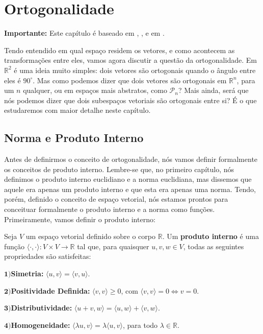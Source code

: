 \chapter{Ortogonalidade}
\label{cap:ortogonalidade}

\textbf{Importante:} Este capítulo é baseado em \cite{axler2026}, \cite{slide5doyuri}, \cite{ruggiero2021algebra} e em \cite{trefethen1997numerical}.

Tendo entendido em qual espaço residem os vetores, e como acontecem as transformações entre eles, vamos agora discutir a questão da ortogonalidade. Em $\mathbb{R}^2$ é uma ideia muito simples: dois vetores são ortogonais quando o ângulo entre eles é $90^\circ$. Mas como podemos dizer que dois vetores são ortogonais em $\mathbb{R}^n$, para um $n$ qualquer, ou em espaços mais abstratos, como $\mathcal{P}_n$? Mais ainda, será que nós podemos dizer que dois subespaços vetoriais são ortogonais entre si? É o que estudaremos com maior detalhe neste capítulo.

\section{Norma e Produto Interno}

Antes de definirmos o conceito de ortogonalidade, nós vamos definir formalmente os conceitos de produto interno. Lembre-se que, no primeiro capítulo, nós definimos o produto interno euclidiano e a norma euclidiana, mas dissemos que aquele era apenas um produto interno e que esta era apenas uma norma. Tendo, porém, definido o conceito de espaço vetorial, nós estamos prontos para conceituar formalmente o produto interno e a norma como funções. Primeiramente, vamos definir o produto interno:

\begin{Definition}
	Seja $V$ um espaço vetorial definido sobre o corpo $\mathbb{R}$. Um \textbf{produto interno} é uma função $\langle\cdot, \cdot\rangle:V\times V\to\mathbb{R}$ tal que, para quaisquer $u, v, w\in V$, todas as seguintes propriedades são satisfeitas:
	
	$\mathbf{1)}$\textbf{Simetria:} $\langle u, v\rangle = \langle v, u\rangle$.
	
	$\mathbf{2)}$\textbf{Positividade Definida:} $\langle v, v\rangle\geq 0$, com $\langle v, v\rangle = 0\iff v = 0$.
	
	$\mathbf{3)}$\textbf{Distributividade:} $\langle u + v, w\rangle = \langle u, w\rangle + \langle v, w\rangle$.
	
	$\mathbf{4)}$\textbf{Homogeneidade:} $\langle \lambda u, v\rangle = \lambda\langle u, v\rangle$, para todo $\lambda\in\mathbb{R}$.
\end{Definition}

